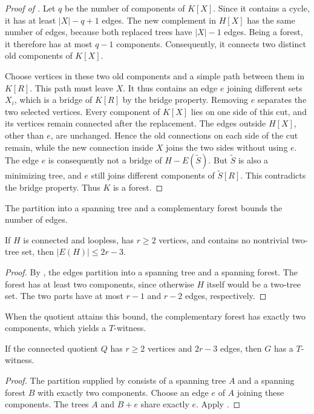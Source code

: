 \documentclass[USenglish, a4paper, thm-restate,numberwithinsect, cleveref]{lipics-v2021}
\begin{document}
\begin{proof}[Proof of ]
Let $q$ be the number of components of $K[X]$. Since it contains a
cycle, it has at least $|X|-q+1$ edges. The new complement in $H[X]$
has the same number of edges, because both replaced trees have
$|X|-1$ edges. Being a forest, it therefore has at most $q-1$
components. Consequently, it connects two distinct old components
of $K[X]$.

Choose vertices in these two old components and a simple path between
them in $K[R]$. This path must leave $X$. It thus contains an edge $e$
joining different sets $X_i$, which is a bridge of $K[R]$ by the
bridge property. Removing $e$ separates the two selected vertices.
Every component of $K[X]$ lies on one side of this cut, and its
vertices remain connected after the replacement. The edges outside
$H[X]$, other than $e$, are unchanged. Hence the old connections on
each side of the cut remain, while the new connection inside $X$
joins the two sides without using $e$. The edge $e$ is consequently
not a bridge of $H-E(\widetilde S)$.
But $\widetilde S$ is also a minimizing tree, and $e$ still joins
different components of $\widetilde S[R]$. This contradicts the
bridge property. Thus $K$ is a forest.
\end{proof}

The partition into a spanning tree and a complementary forest bounds
the number of edges.

\begin{corollary}\label{cor:characterization-edges}
If $H$ is connected and loopless, has $r\geq2$ vertices, and contains
no nontrivial two-tree set, then $|E(H)|\leq2r-3$.
\end{corollary}
\begin{proof}
By , the edges partition into a spanning
tree and a spanning forest. The forest has at least two components,
since otherwise $H$ itself would be a two-tree set. The two parts
have at most $r-1$ and $r-2$ edges, respectively.
\end{proof}

When the quotient attains this bound, the complementary forest has
exactly two components, which yields a $T$-witness.

\begin{corollary}\label{cor:characterization-t-case}
If the connected quotient $Q$ has $r\geq2$ vertices and $2r-3$ edges,
then $G$ has a $T$-witness.
\end{corollary}
\begin{proof}
The partition supplied by  consists of a
spanning tree $A$ and a spanning forest $B$ with exactly two components.
Choose an edge $e$ of $A$ joining these components. The trees $A$
and $B+e$ share exactly $e$. Apply .
\end{proof}
\end{document}
